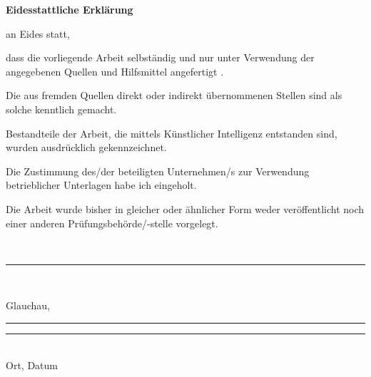 \cleardoublepage
{}
\rohead{}
    \vspace*{1cm}
    \begin{center}
        \huge\textbf{Eidesstattliche Erklärung}\\
    \end{center}
    \vspace*{1cm}
    \normalsize
     an Eides statt,

    dass  die vorliegende Arbeit selbständig und nur unter Verwendung der angegebenen Quellen und Hilfsmittel angefertigt .

    Die aus fremden Quellen direkt oder indirekt übernommenen Stellen sind als solche kenntlich gemacht.

    Bestandteile der Arbeit, die mittels Künstlicher Intelligenz entstanden sind, wurden ausdrücklich gekennzeichnet.

    Die Zustimmung des/der beteiligten Unternehmen/s zur Verwendung betrieblicher Unterlagen habe ich eingeholt.

    Die Arbeit wurde bisher in gleicher oder ähnlicher Form weder veröffentlicht noch einer anderen Prüfungsbehörde/-stelle vorgelegt.

    \vspace{2cm}
    \autoreins\ifthenelse{\isundefined{\autorzwei}}{}{, \autorzwei\ifthenelse{\isundefined{\autordrei}}{}{, \autordrei\ifthenelse{\isundefined{\autorvier}}{}{, \autorvier}}}\\
    \noindent\rule{0.35\columnwidth}{0.4pt}\\
    \vspace{2cm}
    
    Glauchau, \abgabedatum\newline\noindent\rule{0.35\columnwidth}{0.4pt}\hspace{0.05\columnwidth}\rule{0.6\columnwidth}{0.4pt}\\
    Ort, Datum\hspace{0.27\columnwidth}

